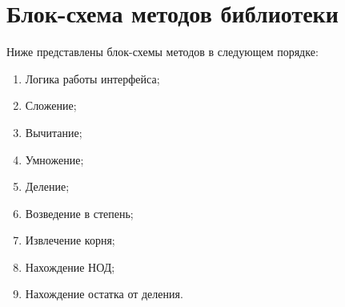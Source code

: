 \clearpage
\section{Блок-схема методов библиотеки}
Ниже представлены блок-схемы методов в следующем порядке:
\begin{enumerate}
    \item Логика работы интерфейса;
    \item Сложение;
    \item Вычитание;
    \item Умножение;
    \item Деление;
    \item Возведение в степень;
    \item Извлечение корня;
    \item Нахождение НОД;
    \item Нахождение остатка от деления.
\end{enumerate}


